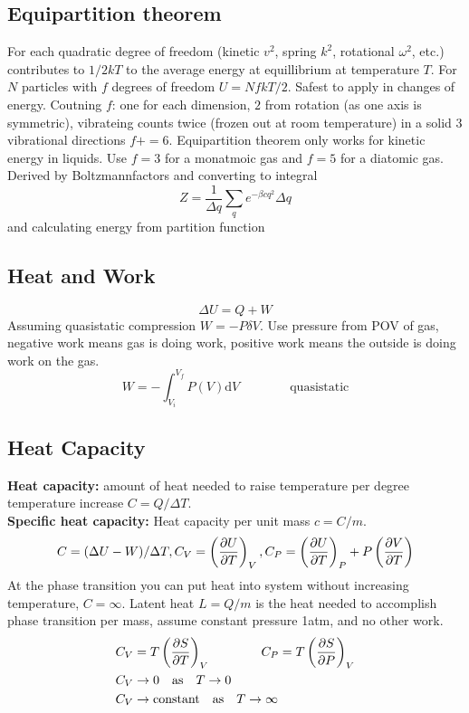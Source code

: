 \documentclass[a4paper, norsk, 8pt]{article}
\begin{document}
\begin{multicols*}{3}
\subsection*{\footnotesize  Equipartition theorem}
For each quadratic degree of freedom (kinetic $v^2$, spring $k^2$, rotational $\omega^2$, etc.) contributes to $1/2kT$ to the average energy at equillibrium at temperature $T$. For $N$ particles with $f$ degrees of freedom $U = NfkT/2$. Safest to apply in changes of energy. Coutning $f$: one for each dimension, $2$ from rotation (as one axis is symmetric), vibrateing counts twice (frozen out at room temperature) in a solid $3$ vibrational directions $f+=6$. Equipartition theorem only works for kinetic energy in liquids. Use $f=3$ for a monatmoic gas and $f=5$ for a diatomic gas.\\
Derived by Boltzmannfactors and converting to integral
\begin{equation*}
    Z = \frac{1}{\Delta q}\sum_q e^{-\beta c q^2}\Delta q
\end{equation*}
and calculating energy from partition function
\subsection*{\footnotesize  Heat and Work}
\begin{equation*}
  \Delta U = Q + W
\end{equation*}
Assuming quasistatic compression $W = -P\delta V$. Use pressure from POV of gas, negative work means gas is doing work, positive work means the outside is doing work on the gas.
\begin{equation*}
  W = -\int_{V_i}^{V_f}P(V) \mbox{d} V \qquad \qquad \text{quasistatic}
\end{equation*}

\subsection*{\footnotesize  Heat Capacity}
\textbf{Heat capacity:} amount of heat needed to raise temperature per degree temperature increase $C=Q/\Delta T$.\\
\textbf{Specific heat capacity:} Heat capacity per unit mass $c=C/m$.\\
\begin{equation*}
  C = (\Delta U - W)/\Delta T, C_V = \left(\pdv{U}{T}\right)_V, C_P = \left(\pdv{U}{T}\right)_P + P\left( \pdv{V}{T} \right)
\end{equation*}
At the phase transition you can put heat into system without increasing temperature, $C=\infty$. Latent heat $L=Q/m$ is the heat needed to accomplish phase transition per mass, assume constant pressure 1atm, and no other work.
\begin{align*}
  C_V &= T\left( \pdv{S}{T} \right)_V \qquad \qquad   C_P = T \left( \pdv{S}{P} \right)_V\\
  C_V &\rightarrow 0 \quad \text{as} \quad T \rightarrow 0 \\
  C_V &\rightarrow \text{constant} \quad \text{as} \quad T \rightarrow \infty
\end{align*}



\end{multicols*}
\end{document}
